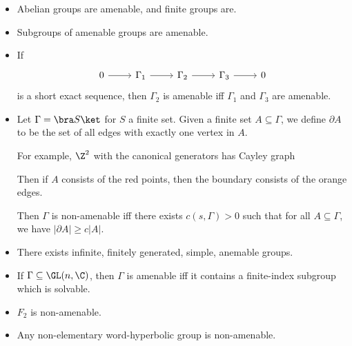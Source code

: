 \documentclass[a4paper]{article}
\newcommand\Free{F}
\begin{document}
\begin{eg}\leavevmode
  \begin{itemize}
    \item Abelian groups are amenable, and finite groups are.
    \item Subgroups of amenable groups are amenable.
    \item If
      \[
        \begin{tikzcd}
          0 \ar[r] & \Gamma_1 \ar[r] & \Gamma_2 \ar[r] & \Gamma_3 \ar[r] & 0
        \end{tikzcd}
      \]
      is a short exact sequence, then $\Gamma_2$ is amenable iff $\Gamma_1$ and $\Gamma_3$ are amenable.
    \item Let $\Gamma = \bra S \ket$ for $S$ a finite set. Given a finite set $A \subseteq \Gamma$, we define $\partial A$ to be the set of all edges with exactly one vertex in $A$.

      For example, $\Z^2$ with the canonical generators has Cayley graph
      \begin{center}
      \end{center}
      Then if $A$ consists of the red points, then the boundary consists of the orange edges.

      Then $\Gamma$ is non-amenable iff there exists $c (s, \Gamma) > 0$ such that for all $A \subseteq \Gamma$, we have $|\partial A| \geq c|A|$.
    \item There exists infinite, finitely generated, simple, anemable groups.
    \item If $\Gamma \subseteq \GL(n, \C)$, then $\Gamma$ is amenable iff it contains a finite-index subgroup which is solvable.
    \item $\Free_2$ is non-amenable.
    \item Any non-elementary word-hyperbolic group is non-amenable.
  \end{itemize}
\end{eg}
\end{document}
